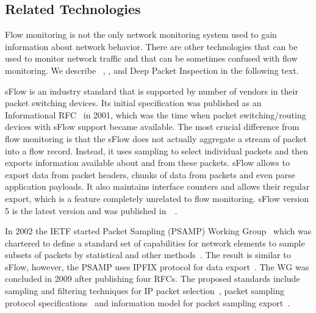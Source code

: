 \subsection{Related Technologies}

Flow monitoring is not the only network monitoring system used to gain information about network behavior. There are other technologies that can be used to monitor network traffic and that can be sometimes confused with flow monitoring. We describe ~\cite{Phaal-2004-sFlow}, ,  and Deep Packet Inspection in the following text.

sFlow is an industry standard that is supported by number of vendors in their packet switching devices. Its initial specification was published as an Informational RFC~\cite{rfc3176} in 2001, which was the time when packet switching/routing devices with sFlow support became available. The most crucial difference from flow monitoring is that the sFlow does not actually aggregate a stream of packet into a flow record. Instead, it uses sampling to select individual packets and then exports information available about and from these packets. sFlow allows to export data from packet headers, chunks of data from packets and even parse application payloads. It also maintains interface counters and allows their regular export, which is a feature completely unrelated to flow monitoring. sFlow version 5 is the latest version and was published in~\citeyear{Phaal-2004-sFlow}~\cite{Phaal-2004-sFlow}.

In 2002 the IETF started Packet Sampling (PSAMP) Working Group~\cite{IETF--Packet} which was chartered to define a standard set of capabilities for network elements to sample subsets of packets by statistical and other methods~\cite{IESG--Packet}. The result is similar to sFlow, however, the PSAMP uses IPFIX protocol for data export~\cite{rfc5477}. The WG was concluded in 2009 after publishing four RFCs. The proposed standards include sampling and filtering techniques for IP packet selection~\cite{rfc5475}, packet sampling protocol specifications~\cite{rfc5476} and information model for packet sampling export~\cite{rfc5477}.

